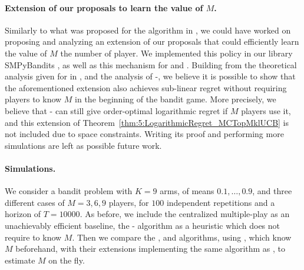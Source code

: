 \paragraph{Extension of our proposals to learn the value of $M$.}

Similarly to what was proposed for the \rhoRandEst{} algorithm in \cite{Anandkumar11}, we could have worked on proposing and analyzing an extension of our proposals that could efficiently learn the value of $M$ the number of player.
We implemented this \rhoRandEst{} policy in our library SMPyBandits \cite{SMPyBandits}, as well as this mechanism for \RandTopM{} and \MCTopM.
Building from the theoretical analysis given for \rhoRandEst{} in \cite{Anandkumar11}, and the analysis of \MCTopM-\klUCB, we believe it is possible to show that the aforementioned extension also achieves sub-linear regret without requiring players to know $M$ in the beginning of the bandit game.
More precisely, we believe that \MCTopM-\klUCB{} can still give order-optimal logarithmic regret if $M$ players use it, and this extension of Theorem~\ref{thm:5:LogarithmicRegret_MCTopMklUCB} is not included due to space constraints.
Writing its proof and performing more simulations are left as possible future work.

\paragraph{Simulations.}

We consider a bandit problem with $K=9$ arms, of means $0.1,\dots,0.9$, and three different cases of $M=3,6,9$ players, for $100$ independent repetitions and a horizon of $T=10000$.
As before, we include the centralized multiple-play \klUCB{} as an unachievably efficient baseline, the \Selfish-\klUCB{} algorithm as a heuristic which does not require to know $M$.
Then we compare the \RhoRand, \RandTopM{} and \MCTopM{} algorithms, using \klUCB, which know $M$ beforehand, with their extensions implementing the same algorithm as \rhoRandEst, to estimate $M$ on the fly.




